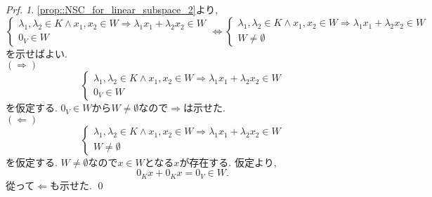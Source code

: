 \documentclass[a4paper,10pt,report]{amsart}
\theoremstyle{plain}
\theoremstyle{definition}
\theoremstyle{remark}
\newtheorem{prf}{Prf.}
\begin{document}
\begin{prf}
    \cref{prop::NSC_for_linear_subspace_2}より, 
    \begin{equation*}
        \begin{cases}
            \lambda_{1}, \lambda_{2}\in K\wedge x_{1}, x_{2}\in W\Rightarrow \lambda_{1}x_{1}+\lambda_{2}x_{2}\in W\\
            0_{V}\in W
        \end{cases}
        \Leftrightarrow
        \begin{cases}
            \lambda_{1}, \lambda_{2}\in K\wedge x_{1}, x_{2}\in W\Rightarrow \lambda_{1}x_{1}+\lambda_{2}x_{2}\in W\\
            W\neq\emptyset
        \end{cases}
    \end{equation*}
    を示せばよい. \\
    \((\Rightarrow)\)
    \begin{equation*}
        \begin{cases}
            \lambda_{1}, \lambda_{2}\in K\wedge x_{1}, x_{2}\in W\Rightarrow \lambda_{1}x_{1}+\lambda_{2}x_{2}\in W\\
            0_{V}\in W
        \end{cases}
    \end{equation*}
    を仮定する. \(0_{V}\in W\)から\(W\neq\emptyset{}\)なので\(\Rightarrow{}\)は示せた. \\
    \((\Leftarrow)\)
    \begin{equation*}
        \begin{cases}
            \lambda_{1}, \lambda_{2}\in K\wedge x_{1}, x_{2}\in W\Rightarrow \lambda_{1}x_{1}+\lambda_{2}x_{2}\in W\\
            W\neq\emptyset
        \end{cases}
    \end{equation*}
    を仮定する. \(W\neq\emptyset{}\)なので\(x\in W\)となる\(x\)が存在する. 
    仮定より, 
    \begin{equation*}
        0_{K}x+0_{K}x=0_{V}\in W.
    \end{equation*}
    從って\(\Leftarrow{}\)も示せた.
    \qed{}
\end{prf}
\end{document}
